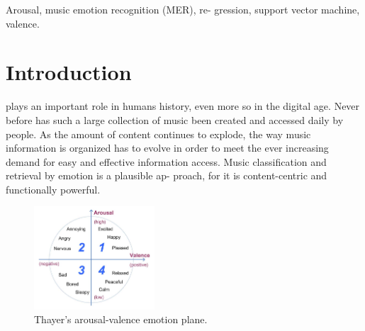 \documentclass[journal, twoside]{IEEEtran}
\begin{document}
\begin{IEEEkeywords}
Arousal, music emotion recognition (MER), re-
gression, support vector machine, valence.
\end{IEEEkeywords}






%
\IEEEpeerreviewmaketitle



\section{Introduction}
% 
% 
% 
% 
 plays an important role in human\textquotesingle s history, even more so in the digital age. Never before has such a large
collection of music been created and accessed daily by people.
As the amount of content continues to explode, the way music
information is organized has to evolve in order to meet the ever
increasing demand for easy and effective information access.
Music classification and retrieval by emotion is a plausible ap-
proach, for it is content-centric and functionally powerful. 

\begin{figure}[h]
\centering
\captionsetup{justification=centering}
\includegraphics[width=0.4\textwidth, height=0.3\textwidth]{fig1.png}
\caption{Thayer’s arousal-valence emotion plane.}
\label{fig1}
\end{figure}
\end{document}
